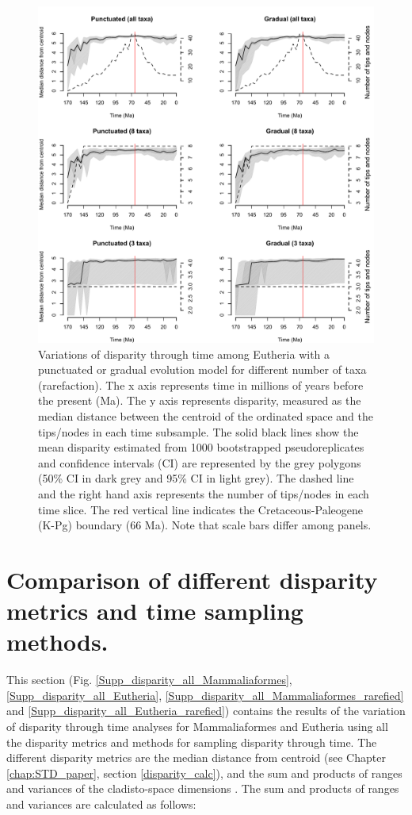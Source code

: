 \begin{figure}
\centering
    \includegraphics[keepaspectratio=true]{Supplementaries/Figures/STD/Rarefaction-beck.pdf}
\caption[Eutheria disparity (rarefied)]{Variations of disparity through time among Eutheria with a punctuated or gradual evolution model for different number of taxa (rarefaction). The x axis represents time in millions of years before the present (Ma). The y axis represents disparity, measured as the median distance between the centroid of the ordinated space and the tips/nodes in each time subsample. The solid black lines show the mean disparity estimated from 1000 bootstrapped pseudoreplicates and confidence intervals (CI) are represented by the grey polygons (50\% CI in dark grey and 95\% CI in light grey). The dashed line and the right hand axis represents the number of tips/nodes in each time slice. The red vertical line indicates the Cretaceous-Paleogene (K-Pg) boundary (66 Ma). Note that scale bars differ among panels.}
\label{Supp_Eutheria_rarefied}
\end{figure}

\newpage
\section{Comparison of different disparity metrics and time sampling methods.}
This section (Fig. \ref{Supp_disparity_all_Mammaliaformes}, \ref{Supp_disparity_all_Eutheria}, \ref{Supp_disparity_all_Mammaliaformes_rarefied} and \ref{Supp_disparity_all_Eutheria_rarefied}) contains the results of the variation of disparity through time analyses for Mammaliaformes and Eutheria using all the disparity metrics and methods for sampling disparity through time.
The different disparity metrics are the median distance from centroid (see Chapter \ref{chap:STD_paper}, section \ref{disparity_calc}), and the sum and products of ranges and variances of the cladisto-space dimensions \citep{Wills1994}.
The sum and products of ranges and variances are calculated as follows:

